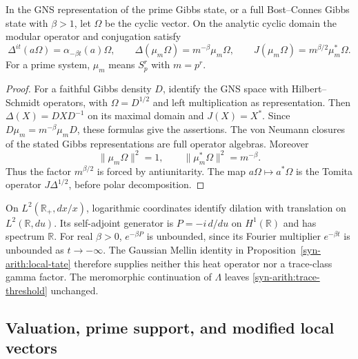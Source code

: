 \begin{proposition}
\label{syn-arith:modular}
In the GNS representation of the prime Gibbs state, or a full
Bost--Connes Gibbs state with $\beta>1$, let $\Omega$ be the cyclic vector.
On the analytic cyclic domain the modular operator and conjugation satisfy
\[
 \Delta^{it}(a\Omega)=\alpha_{-\beta t}(a)\Omega,
 \qquad
 \Delta(\mu_m\Omega)=m^{-\beta}\mu_m\Omega,
 \qquad
 J(\mu_m\Omega)=m^{\beta/2}\mu_m^*\Omega.
\]
For a prime system, $\mu_m$ means $S_p^r$ with $m=p^r$.
\end{proposition}
\begin{proof}
For a faithful Gibbs density $D$, identify the GNS space with Hilbert--Schmidt
operators, with $\Omega=D^{1/2}$ and left multiplication as representation.
Then $\Delta(X)=DXD^{-1}$ on its maximal domain and $J(X)=X^*$.
Since $D\mu_m=m^{-\beta}\mu_mD$, these formulas give the assertions.
The von Neumann closures of the stated Gibbs representations are full operator algebras.
Moreover
\[
 \|\mu_m\Omega\|^2=1,\qquad
 \|\mu_m^*\Omega\|^2=m^{-\beta}.
\]
Thus the factor $m^{\beta/2}$ is forced by antiunitarity.
The map $a\Omega\mapsto a^*\Omega$ is the Tomita operator
$J\Delta^{1/2}$, before polar decomposition.
\end{proof}

\begin{remark}
\label{syn-arith:no-gaussian-operator}
On $L^2(\mathbb R_+,dx/x)$, logarithmic coordinates identify dilation
with translation on $L^2(\mathbb R,du)$.  Its self-adjoint generator is
$P=-i\,d/du$ on $H^1(\mathbb R)$ and has spectrum $\mathbb R$.
For real $\beta>0$, $e^{-\beta P}$ is unbounded, since its Fourier multiplier
$e^{-\beta t}$ is unbounded as $t\to-\infty$.
The Gaussian Mellin identity in Proposition~\ref{syn-arith:local-tate}
therefore supplies neither this heat operator nor a trace-class gamma factor.
The meromorphic continuation of $\Lambda$ leaves
\eqref{syn-arith:trace-threshold} unchanged.
\end{remark}

\subsection{Valuation, prime support, and modified local vectors}
\label{syn-arith:two-source}

